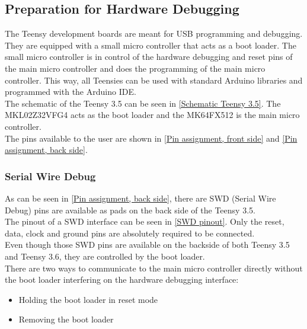 \subsection{Preparation for Hardware Debugging}
The Teensy development boards are meant for USB programming and debugging. They are equipped with a small micro controller that acts as a boot loader. The small micro controller is in control of the hardware debugging and reset pins of the main micro controller and does the programming of the main micro controller. This way, all Teensies can be used with standard Arduino libraries and programmed with the Arduino IDE. \\
The schematic of the Teensy 3.5 can be seen in \autoref{Schematic Teensy 3.5}. The MKL02Z32VFG4 acts as the boot loader and the MK64FX512 is the main micro controller.\\
The pins available to the user are shown in \autoref{Pin assignment, front side} and \autoref{Pin assignment, back side}. \\
%
\subsubsection{Serial Wire Debug}
As can be seen in \autoref{Pin assignment, back side}, there are SWD (Serial Wire Debug) pins are available as pads on the back side of the Teensy 3.5. \\
The pinout of a SWD interface can be seen in \autoref{SWD pinout}. Only the reset, data, clock and ground pins are absolutely required to be connected.\\
Even though those SWD pins are available on the backside of both Teensy 3.5 and Teensy 3.6, they are controlled by the boot loader. \\
There are two ways to communicate to the main micro controller directly without the boot loader interfering on the hardware debugging interface:
\begin{itemize}
    \item Holding the boot loader in reset mode
    \item Removing the boot loader
\end{itemize}
